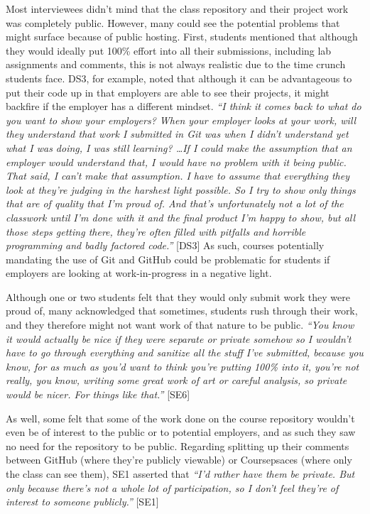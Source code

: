 Most interviewees didn't mind that the class repository and their project work was completely public. However, many could see the potential problems that might surface because of public hosting. First, students mentioned that although they would ideally put 100\% effort into all their submissions, including lab assignments and comments, this is not always realistic due to the time crunch students face. DS3, for example, noted that although it can be advantageous to put their code up in that employers are able to see their projects, it might backfire if the employer has a different mindset. \textit{``I think it comes back to what do you want to show your employers? When your employer looks at your work, will they understand that work I submitted in Git was when I didn't understand yet what I was doing, I was still learning? \ldots If I could make the assumption that an employer would understand that, I would have no problem with it being public. That said, I can't make that assumption. I have to assume that everything they look at they're judging in the harshest light possible. So I try to show only things that are of quality that I'm proud of. And that's unfortunately not a lot of the classwork until I'm done with it and the final product I'm happy to show, but all those steps getting there, they're often filled with pitfalls and horrible programming and badly factored code.''} [DS3] As such, courses potentially mandating the use of Git and GitHub could be problematic for students if employers are looking at work-in-progress in a negative light.

Although one or two students felt that they would only submit work they were proud of, many acknowledged that sometimes, students rush through their work, and they therefore might not want work of that nature to be public. \textit{``You know it would actually be nice if they were separate or private somehow so I wouldn't have to go through everything and sanitize all the stuff I've submitted, because you know, for as much as you'd want to think you're putting 100\% into it, you're not really, you know, writing some great work of art or careful analysis, so private would be nicer. For things like that.''} [SE6]

As well, some felt that some of the work done on the course repository wouldn't even be of interest to the public or to potential employers, and as such they saw no need for the repository to be public. Regarding splitting up their comments between GitHub (where they're publicly viewable) or Coursepsaces (where only the class can see them), SE1 asserted that \textit{``I'd rather have them be private. But only because there's not a whole lot of participation, so I don't feel they're of interest to someone publicly.''} [SE1]

